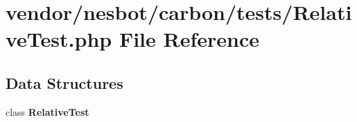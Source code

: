 \section{vendor/nesbot/carbon/tests/\+Relative\+Test.php File Reference}
\label{_relative_test_8php}
\subsection*{Data Structures}
\begin{DoxyCompactItemize}
\item 
class {\bf Relative\+Test}
\end{DoxyCompactItemize}
